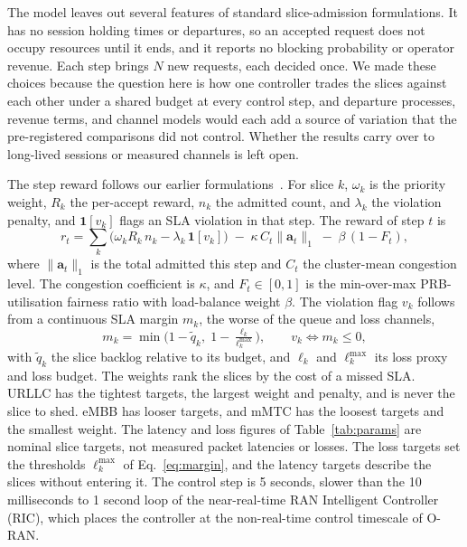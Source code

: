 \documentclass[pdflatex,sn-basic,Numbered]{sn-jnl}
\begin{document}
The model leaves out several features of standard slice-admission formulations. It has no session holding times or departures, so an accepted request does not occupy resources until it ends, and it reports no blocking probability or operator revenue. Each step brings $N$ new requests, each decided once. We made these choices because the question here is how one controller trades the slices against each other under a shared budget at every control step, and departure processes, revenue terms, and channel models would each add a source of variation that the pre-registered comparisons did not control. Whether the results carry over to long-lived sessions or measured channels is left open.

The step reward follows our earlier formulations~\cite{mecon-paper1,icraie-paper2}. For slice $k$, $\omega_k$ is the priority weight, $R_k$ the per-accept reward, $n_k$ the admitted count, and $\lambda_k$ the violation penalty, and $\mathbf{1}[v_k]$ flags an SLA violation in that step. The reward of step $t$ is
\begin{equation}
\label{eq:reward}
r_t = \sum_{k}\!\big(\omega_k R_k\, n_k - \lambda_k\,\mathbf{1}[v_k]\big)
      \;-\; \kappa\, C_t \lVert \mathbf{a}_t \rVert_1
      \;-\; \beta\,(1 - F_t),
\end{equation}
where $\lVert \mathbf{a}_t \rVert_1$ is the total admitted this step and $C_t$ the cluster-mean congestion level. The congestion coefficient is $\kappa$, and $F_t\!\in\![0,1]$ is the min-over-max PRB-utilisation fairness ratio with load-balance weight $\beta$. The violation flag $v_k$ follows from a continuous SLA margin $m_k$, the worse of the queue and loss channels,
\begin{equation}
\label{eq:margin}
m_k = \min\!\Big(1 - \tilde q_k,\; 1 - \tfrac{\ell_k}{\ell_k^{\max}}\Big),
\qquad v_k \Leftrightarrow m_k \le 0,
\end{equation}
with $\tilde q_k$ the slice backlog relative to its budget, and $\ell_k$ and $\ell_k^{\max}$ its loss proxy and loss budget. The weights rank the slices by the cost of a missed SLA. URLLC has the tightest targets, the largest weight and penalty, and is never the slice to shed. eMBB has looser targets, and mMTC has the loosest targets and the smallest weight. The latency and loss figures of Table~\ref{tab:params} are nominal slice targets, not measured packet latencies or losses. The loss targets set the thresholds $\ell_k^{\max}$ of Eq.~\eqref{eq:margin}, and the latency targets describe the slices without entering it. The control step is 5 seconds, slower than the 10 milliseconds to 1 second loop of the near-real-time RAN Intelligent Controller (RIC), which places the controller at the non-real-time control timescale of O-RAN.
\end{document}
